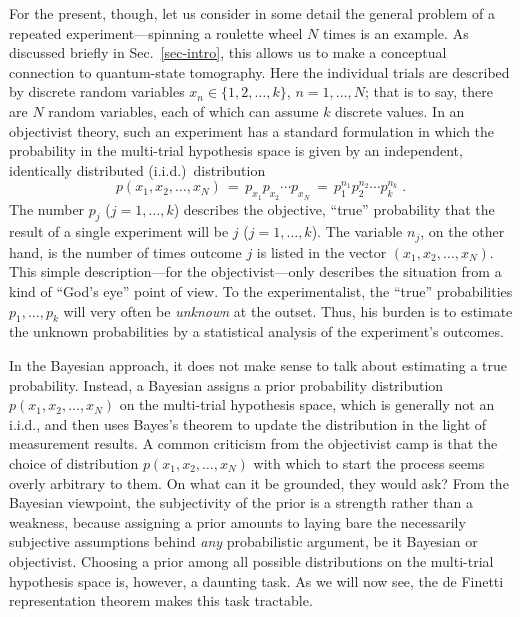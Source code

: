 For the present, though, let us consider in some detail the
general problem of a repeated experiment---spinning a roulette
wheel $N$ times is an example. As discussed briefly in
Sec.~\ref{sec-intro}, this allows us to make a conceptual
connection to quantum-state tomography.  Here the individual
trials are described by discrete random variables
$x_n\in\{1,2,\ldots,k\}$, $n=1,\ldots,N$; that is to say, there
are $N$ random variables, each of which can assume $k$ discrete
values. In an objectivist theory, such an experiment has a
standard formulation in which the probability in the multi-trial
hypothesis space is given by an independent, identically
distributed (i.i.d.)\ distribution
\begin{equation}
p(x_1,x_2,\ldots,x_N)\,=\,p_{x_1} p_{x_2} \cdots p_{x_N}\, =\,
p_1^{n_{\scriptscriptstyle 1}} p_2^{n_{\scriptscriptstyle 2}}\cdots
p_k^{n_{\scriptscriptstyle k}}\;.
\label{eq-iid}
\end{equation}
The number $p_j$ ($j=1,\ldots,k$) describes the objective,
``true'' probability that the result of a single experiment will
be $j$ ($j=1,\ldots,k$).  The variable $n_j$, on the other hand,
is the number of times outcome $j$ is listed in the vector
$(x_1,x_2,\ldots,x_N)$.  This simple description---for the
objectivist---only describes the situation from a kind of ``God's
eye'' point of view.  To the experimentalist, the ``true''
probabilities $p_1,\ldots,p_k$ will very often be {\it unknown\/}
at the outset.  Thus, his burden is to estimate the unknown
probabilities by a statistical analysis of the experiment's
outcomes.

In the Bayesian approach, it does not make sense to talk about
estimating a true probability.  Instead, a Bayesian assigns a
prior probability distribution $p(x_1,x_2,\ldots,x_N)$ on the
multi-trial hypothesis space, which is generally not an i.i.d.,
and then uses Bayes's theorem to update the distribution in the
light of measurement results. A common criticism from the
objectivist camp is that the choice of distribution
$p(x_1,x_2,\ldots,x_N)$ with which to start the process seems
overly arbitrary to them. On what can it be grounded, they would
ask? From the Bayesian viewpoint, the subjectivity of the prior is
a strength rather than a weakness, because assigning a prior
amounts to laying bare the necessarily subjective assumptions
behind {\it any\/} probabilistic argument, be it Bayesian or
objectivist. Choosing a prior among all possible distributions on
the multi-trial hypothesis space is, however, a daunting task. As
we will now see, the de Finetti representation theorem makes this
task tractable.

